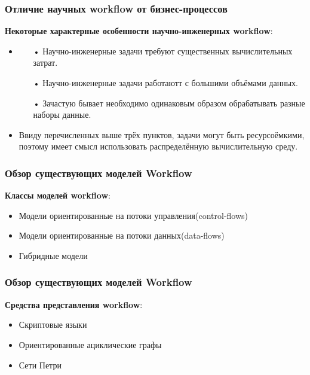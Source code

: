 \documentclass[10pt,pdf,hyperref={unicode}]{beamer}
\begin{document}
\begin{frame}
\frametitle{Отличие научных workflow от бизнес-процессов}
 \textbf{ Некоторые характерные особенности научно-инженерных workflow}:
\begin{itemize}
\item<1-> 
\begin{enumerate}
\item[•] Научно-инженерные задачи требуют существенных вычислительных затрат.
\item[•] Научно-инженерные задачи работаютт с большими объёмами данных.
\item[•] Зачастую бывает  необходимо одинаковым образом обрабатывать разные наборы данные.
\end{enumerate}
\item<1-> Ввиду перечисленных выше трёх пунктов, задачи могут быть ресурсоёмкими, поэтому имеет смысл использовать распределённую вычислительную среду.
\end{itemize}
\end{frame}


\begin{frame}
\frametitle{Обзор существующих моделей Workflow}

\textbf{Классы моделей workflow}:
\begin{itemize}
\item<1-> Модели ориентированные на потоки управления(control-flows)
\item<1-> Модели ориентированные на потоки данных(data-flows)
\item<1-> Гибридные модели
\end{itemize}

\end{frame}

\begin{frame}
\frametitle{Обзор существующих моделей Workflow}

\textbf{Средства представления workflow}:
\begin{itemize}
\item<1-> Скриптовые языки
\item<1-> Ориентированные ациклические графы
\item<1-> Сети Петри
\end{itemize}

\end{frame}
\end{document}

